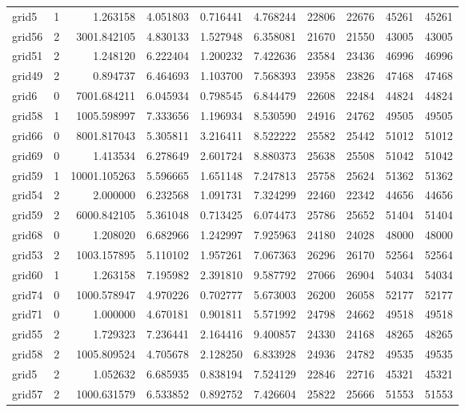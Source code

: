 \begin{longtable}{|l|r|r|r|r|r|r|r|r|r|}
grid5 & 1 & 1.263158 & 4.051803 & 0.716441 & 4.768244 & 22806 & 22676 & 45261 & 45261 \\
grid56 & 2 & 3001.842105 & 4.830133 & 1.527948 & 6.358081 & 21670 & 21550 & 43005 & 43005 \\
grid51 & 2 & 1.248120 & 6.222404 & 1.200232 & 7.422636 & 23584 & 23436 & 46996 & 46996 \\
grid49 & 2 & 0.894737 & 6.464693 & 1.103700 & 7.568393 & 23958 & 23826 & 47468 & 47468 \\
grid6 & 0 & 7001.684211 & 6.045934 & 0.798545 & 6.844479 & 22608 & 22484 & 44824 & 44824 \\
grid58 & 1 & 1005.598997 & 7.333656 & 1.196934 & 8.530590 & 24916 & 24762 & 49505 & 49505 \\
grid66 & 0 & 8001.817043 & 5.305811 & 3.216411 & 8.522222 & 25582 & 25442 & 51012 & 51012 \\
grid69 & 0 & 1.413534 & 6.278649 & 2.601724 & 8.880373 & 25638 & 25508 & 51042 & 51042 \\
grid59 & 1 & 10001.105263 & 5.596665 & 1.651148 & 7.247813 & 25758 & 25624 & 51362 & 51362 \\
grid54 & 2 & 2.000000 & 6.232568 & 1.091731 & 7.324299 & 22460 & 22342 & 44656 & 44656 \\
grid59 & 2 & 6000.842105 & 5.361048 & 0.713425 & 6.074473 & 25786 & 25652 & 51404 & 51404 \\
grid68 & 0 & 1.208020 & 6.682966 & 1.242997 & 7.925963 & 24180 & 24028 & 48000 & 48000 \\
grid53 & 2 & 1003.157895 & 5.110102 & 1.957261 & 7.067363 & 26296 & 26170 & 52564 & 52564 \\
grid60 & 1 & 1.263158 & 7.195982 & 2.391810 & 9.587792 & 27066 & 26904 & 54034 & 54034 \\
grid74 & 0 & 1000.578947 & 4.970226 & 0.702777 & 5.673003 & 26200 & 26058 & 52177 & 52177 \\
grid71 & 0 & 1.000000 & 4.670181 & 0.901811 & 5.571992 & 24798 & 24662 & 49518 & 49518 \\
grid55 & 2 & 1.729323 & 7.236441 & 2.164416 & 9.400857 & 24330 & 24168 & 48265 & 48265 \\
grid58 & 2 & 1005.809524 & 4.705678 & 2.128250 & 6.833928 & 24936 & 24782 & 49535 & 49535 \\
grid5 & 2 & 1.052632 & 6.685935 & 0.838194 & 7.524129 & 22846 & 22716 & 45321 & 45321 \\
grid57 & 2 & 1000.631579 & 6.533852 & 0.892752 & 7.426604 & 25822 & 25666 & 51553 & 51553 \\

\end{longtable}
